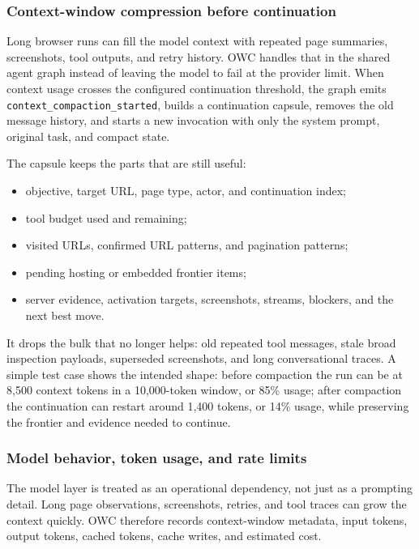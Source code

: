 \subsubsection{Context-window compression before continuation}

Long browser runs can fill the model context with repeated page summaries, screenshots,
tool outputs, and retry history. OWC handles that in the shared agent graph instead of
leaving the model to fail at the provider limit. When context usage crosses the
configured continuation threshold, the graph emits \texttt{context\_compaction\_started},
builds a continuation capsule, removes the old message history, and starts a new
invocation with only the system prompt, original task, and compact state.

The capsule keeps the parts that are still useful:
\begin{itemize}
  \item objective, target URL, page type, actor, and continuation index;
  \item tool budget used and remaining;
  \item visited URLs, confirmed URL patterns, and pagination patterns;
  \item pending hosting or embedded frontier items;
  \item server evidence, activation targets, screenshots, streams, blockers, and the
  next best move.
\end{itemize}

It drops the bulk that no longer helps: old repeated tool messages, stale broad
inspection payloads, superseded screenshots, and long conversational traces. A simple
test case shows the intended shape: before compaction the run can be at 8,500 context
tokens in a 10,000-token window, or 85\% usage; after compaction the continuation can
restart around 1,400 tokens, or 14\% usage, while preserving the frontier and evidence
needed to continue.



\subsubsection{Model behavior, token usage, and rate limits}

The model layer is treated as an operational dependency, not just as a prompting detail.
Long page observations, screenshots, retries, and tool traces can grow the context
quickly. OWC therefore records context-window metadata, input tokens, output tokens,
cached tokens, cache writes, and estimated cost.

